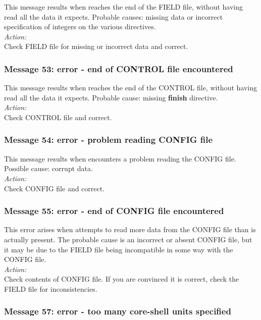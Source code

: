 This message results when \D{} reaches the end of the FIELD file,
without having read all the data it expects. Probable causes: missing
data or incorrect specification of integers on the various directives.\\

\noindent
{\em Action:} \\ 
Check FIELD file for missing or incorrect data and correct.

\subsubsection*{Message 53: error - end of CONTROL file encountered}

This message results when \D{} reaches the end of the CONTROL file,
without having read all the data it expects. Probable cause: missing
{\bf finish} directive.\\

\noindent
{\em Action:} \\ 
Check CONTROL file and correct.

\subsubsection*{Message 54: error - problem reading CONFIG file}

This message results when \D{} encounters a problem reading the CONFIG file.
Possible cause: corrupt data. \\

\noindent
{\em Action:} \\ 
Check CONFIG file and correct.

\subsubsection*{Message 55: error - end of CONFIG file encountered}

This error arises when \D{} attempts to read more data from the
CONFIG file than is actually present. The probable cause is an
incorrect or absent CONFIG file, but it may be due to the FIELD file
being incompatible in some way with the CONFIG file. \\ 

\noindent
{\em Action:} \\ 
Check contents of CONFIG file. If you are convinced it is correct,
check the FIELD file for inconsistencies.

\subsubsection*{Message 57: error - too many core-shell units
specified}


